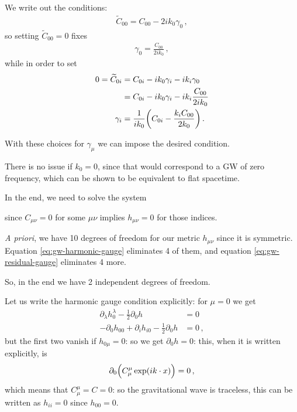 \documentclass[main.tex]{subfiles}
\begin{document}
We write out the conditions: 
%
\begin{align}
\widetilde{C}_{00} = C_{00} - 2 i k_0 \gamma_0 
\,,
\end{align}
%
so setting \(\widetilde{C}_{00} =0 \) fixes 
%
\begin{align}
\gamma_0 = \frac{C_{00} }{2ik_0 }
\,,
\end{align}
%
while  in order to set 
%
\begin{subequations}
\begin{align}
0=\widetilde{C}_{0i} &= C_{0i} - ik_0 \gamma_{i} - i k_{i} \gamma_0  \\
&= C_{0i} - i k_0 \gamma_{i} - i k_{i} \frac{C_{00} }{2 i k_0 }  \\
\gamma_{i } &= \frac{1}{i k_0 } \qty(C_{0i} - \frac{k_{i} C_{00} }{2 k_0 })
\,.
\end{align}
\end{subequations}

With these choices for \(\gamma_{\mu }\) we can impose the desired condition.

There is no issue if \(k_0 = 0\), since that would correspond to a GW of zero frequency, which can be shown to be equivalent to flat spacetime. 

In the end, we need to solve the system 
%

%
since \(C_{\mu \nu }= 0\) for some \(\mu \nu \) implies \(h_{\mu \nu }=0\) for those indices.

\emph{A priori}, we have 10 degrees of freedom for our metric \(h_{\mu \nu }\) since it is symmetric. Equation \eqref{eq:gw-harmonic-gauge} eliminates 4 of them, and equation \eqref{eq:gw-residual-gauge} eliminates 4 more.

So, in the end we have 2 independent degrees of freedom. 

Let us write the harmonic gauge condition explicitly: for \(\mu =0\) we get
%
\begin{subequations}
\begin{align}
\partial_{\lambda } h^{\lambda }_{0} - \frac{1}{2} \partial_{0} h &= 0  \\
- \partial_{0} h_{00} + \partial_{i} h_{i0} - \frac{1}{2} \partial_{0} h &= 0
\,,
\end{align}
\end{subequations}
%
but the first two vanish if \(h_{0\mu } =0\): so we get \(\partial_{0} h = 0\): this, when it is written explicitly, is 
%
\begin{align}
\partial_{0} \qty(C^{\mu }_{\mu } \exp(i k \cdot x)) = 0
\,,
\end{align}
%
which means that \(C^{ \mu }_{\mu } = C = 0\): so the gravitational wave is traceless, this can be written as \(h_{ii}=0\) since \(h_{00} =0  \). 
\end{document}

